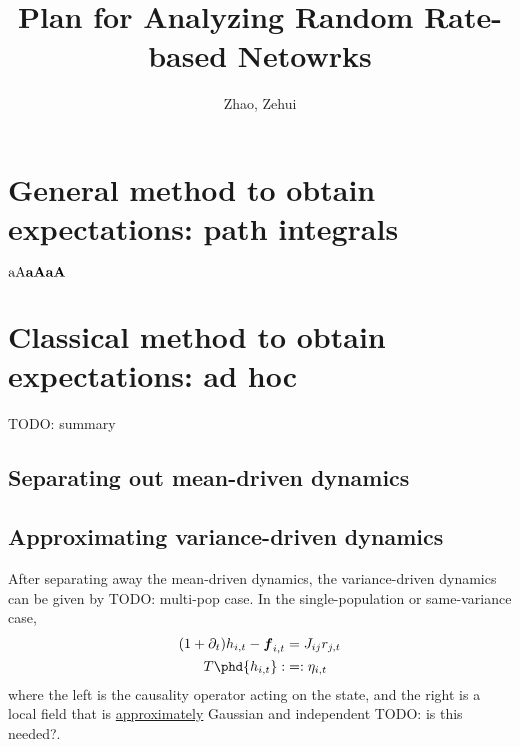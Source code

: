 \documentclass[11pt,openany,oneside]{article} %
\title{\vspace{-2em}Plan for Analyzing Random Rate-based Netowrks}
\author{Zhao, Zehui}
\date{}
\newcommand{\todo}[1]{{\color{red} TODO: #1}}
\begin{document}
\maketitle
\tableofcontents

\section{General method to obtain expectations: path integrals}
$\mathrm{aA}\boldsymbol{\mathrm{aA}}\mathbf{aA}$

\section{Classical method to obtain expectations: ad hoc}
\todo{summary}

\subsection{Separating out mean-driven dynamics}

\subsection{Approximating variance-driven dynamics}
After separating away the mean-driven dynamics, the variance-driven dynamics can be given by
\todo{multi-pop case}.  In the single-population or same-variance case, 
\begin{equation}
  \label{eq:var-dyn}
  \begin{aligned}
      (1+\del_t)h_{i,t} - \bd{f}_{i,t} &= J_{ij}r_{j,t}\\
      T\phd{h_{i,t}} :&= : \eta_{i,t}
  \end{aligned}
\end{equation}
where the left is the causality operator acting on the state, and the right is a local field that is
\uline{approximately} Gaussian and independent \todo{is this needed?}.
\end{document}
